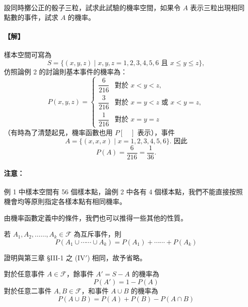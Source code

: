 \medskip
\begin{example}\label{ex:b5s-4-1}
設同時擲公正的骰子三粒，試求此試驗的機率空間，如果令 $A$ 表示三粒出現相同點數的事件，試求 $A$ 的機率。
\end{example}
\paragraph{【解】}
樣本空間可寫為
\[
S = \{(x, y, z) \mid x, y, z = 1, 2, 3, 4, 5, 6 \text{ 且 } x \le y \le z\},
\]
仿照論例 2 的討論則基本事件的機率為：
\[
P(x, y, z) = \begin{cases}
\dfrac{6}{216} & \text{對於 } x < y < z, \\[8pt]
\dfrac{3}{216} & \text{對於 } x = y < z \text{ 或 } x < y = z, \\[8pt]
\dfrac{1}{216} & \text{對於 } x = y = z
\end{cases}
\]
（有時為了清楚起見，機率函數也用 $P[\quad]$ 表示），事件
\[
A = \{(x, x, x) \mid x = 1, 2, 3, 4, 5, 6\}. \text{ 因此}
\]
\[
P(A) = \frac{6}{216} = \frac{1}{36}.
\]

\medskip
\paragraph{注意：}
例 1 中樣本空間有 56 個樣本點，論例 2 中各有 4 個樣本點，我們不能直接按照機會均等原則指定各樣本點有相同機率。

由機率函數定義中的條件，我們也可以推得一些其他的性質。

\medskip
\begin{theorem}\label{thm:b5s-4-1}
若 $A_1, A_2, \dots\dots, A_k \in \mathscr{F}$ 為互斥事件，則
\begin{equation}
P(A_1 \cup \cdots\cdots \cup A_k) = P(A_1) + \cdots\cdots + P(A_k) \label{eq:b5s-ch4-1}
\end{equation}
\end{theorem}
證明與第三章 §III-1 之 ($\text{IV}'$) 相同，故予省略。

\medskip
\begin{theorem}\label{thm:b5s-4-2}
對於任意事件 $A \in \mathscr{F}$，餘事件 $A' = S - A$ 的機率為
\begin{equation}
P(A') = 1 - P(A) \label{eq:b5s-ch4-2}
\end{equation}
對於任意二事件 $A, B \in \mathscr{F}$，和事件 $A \cup B$ 的機率為
\begin{equation}
P(A \cup B) = P(A) + P(B) - P(A \cap B) \label{eq:b5s-ch4-3}
\end{equation}
\end{theorem}
